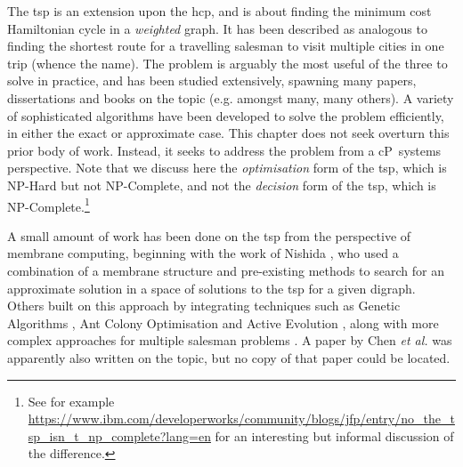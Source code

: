The \gls{tsp} is an extension upon the \gls{hcp}, and is about finding the minimum cost Hamiltonian cycle in a \emph{weighted} graph.  It has been described as analogous to finding the shortest route for a travelling salesman to visit multiple cities in one trip (whence the name).  The problem is arguably the most useful of the three to solve in practice, and has been studied extensively, spawning many papers, dissertations and books on the topic (e.g. \cite{Smith2017,Ezugwu2017,Cook2012,Applegate2006} amongst many, many others).  A variety of sophisticated algorithms have been developed to solve the problem efficiently, in either the exact or approximate case.  This chapter does not seek overturn this prior body of work.  Instead, it seeks to address the problem from a cP~systems perspective.  Note that we discuss here the \emph{optimisation} form of the \gls{tsp}, which is NP-Hard but not NP-Complete, and not the \emph{decision} form of the \gls{tsp}, which is NP-Complete.\footnote{See for example \url{https://www.ibm.com/developerworks/community/blogs/jfp/entry/no_the_tsp_isn_t_np_complete?lang=en} for an interesting but informal discussion of the difference.}%

A small amount of work has been done on the \gls{tsp} from the perspective of membrane computing, beginning with the work of Nishida \cite{Nishida2006}, who used a combination of a membrane structure and pre-existing methods to search for an approximate solution in a space of solutions to the \gls{tsp} for a given digraph.  Others built on this approach by integrating techniques such as Genetic Algorithms \cite{Manalastas2013,He2014}, Ant Colony Optimisation \cite{Zhang2011} and Active Evolution \cite{Song2015}, along with more complex approaches for multiple salesman problems \cite{He2015}.  A paper by Chen \textit{et al.} \cite{Chen2011} was apparently also written on the topic, but no copy of that paper could be located.

